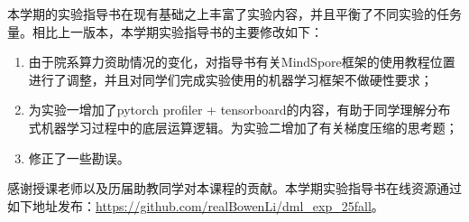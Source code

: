 

\hspace{2em} 本学期的实验指导书在现有基础之上丰富了实验内容，并且平衡了不同实验的任务量。相比上一版本，本学期实验指导书的主要修改如下：
\begin{enumerate}
    \item 由于院系算力资助情况的变化，对指导书有关MindSpore框架的使用教程位置进行了调整，并且对同学们完成实验使用的机器学习框架不做硬性要求；
    \item 为实验一增加了pytorch profiler + tensorboard的内容，有助于同学理解分布式机器学习过程中的底层运算逻辑。为实验二增加了有关梯度压缩的思考题；
    \item 修正了一些勘误。
\end{enumerate}
\hspace{2em} 感谢授课老师以及历届助教同学对本课程的贡献。本学期实验指导书在线资源通过如下地址发布：\url{https://github.com/realBowenLi/dml_exp_25fall}。

\vspace{5em}



